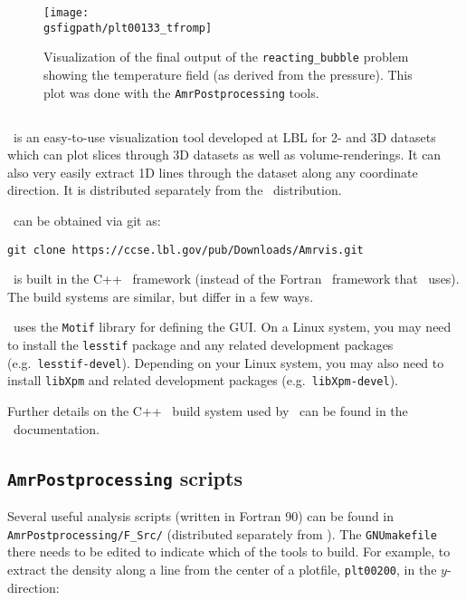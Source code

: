 \begin{figure}[t]
\centering
\texttt{[image: \\gsfigpath/plt00133\_tfromp]}
\caption[Visualization of {\tt reacting\_bubble} output]{\label{fig:gettingstarted:test2} Visualization of the
final output of the {\tt reacting\_bubble} problem showing the temperature
field (as derived from the pressure).  This plot was done with
the {\tt AmrPostprocessing} tools.}
\end{figure}



\subsection{\amrvis}

\amrvis\ is an easy-to-use visualization tool developed at LBL for
2- and 3D datasets which can plot slices through 3D datasets as well
as volume-renderings.  It can also very easily extract 1D lines
through the dataset along any coordinate direction.  It is distributed
separately from the \maestro\ distribution.

\amrvis\ can be obtained via git as:
\begin{verbatim}
git clone https://ccse.lbl.gov/pub/Downloads/Amrvis.git
\end{verbatim}
\amrvis\ is built in the C++ \boxlib\ framework (instead of the Fortran 
\boxlib\ framework that \maestro\ uses).  The build systems are similar,
but differ in a few ways.  

\amrvis\ uses the {\tt Motif} library for defining the GUI.  On a Linux 
system, you may need to install the {\tt lesstif} package and any
related development packages (e.g.\ {\tt lesstif-devel}).  Depending
on your Linux system, you may also need to install {\tt libXpm} and
related development packages (e.g.\ {\tt libXpm-devel}).  

Further details on the C++ \boxlib\ build system used by \amrvis\
can be found in the \boxlib\ documentation.


\subsection{{\tt AmrPostprocessing} scripts}

Several useful analysis scripts (written in Fortran 90) can be found
in {\tt AmrPostprocessing/F\_Src/} (distributed separately
from \maestro).  The {\tt GNUmakefile} there needs to be edited to
indicate which of the tools to build.  For example, to extract the
density along a line from the center of a plotfile, {\tt plt00200}, in
the $y$-direction:

